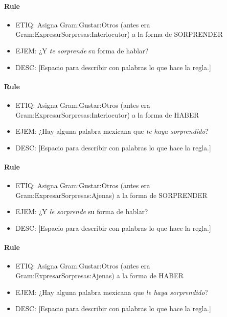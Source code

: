 \documentclass[11pt]{report}
\begin{document}
\paragraph*{Rule}
\begin{itemize}
\item ETIQ: Asigna Gram:Gustar:Otros (antes era Gram:ExpresarSorpresas:Interlocutor) a la forma de SORPRENDER
\item EJEM: ¿Y \emph{te sorprende} su forma de hablar?
\item DESC: [Espacio para describir con palabras lo que hace la regla.]
\end{itemize}

\paragraph*{Rule}
\begin{itemize}
\item ETIQ: Asigna Gram:Gustar:Otros (antes era Gram:ExpresarSorpresas:Interlocutor) a la forma de HABER
\item EJEM: ¿Hay alguna palabra mexicana que \emph{te haya sorprendido}?
\item DESC: [Espacio para describir con palabras lo que hace la regla.]
\end{itemize}

\paragraph*{Rule}
\begin{itemize}
\item ETIQ: Asigna Gram:Gustar:Otros (antes era Gram:ExpresarSorpresas:Ajenas) a la forma de SORPRENDER
\item EJEM: ¿Y \emph{le sorprende} su forma de hablar?
\item DESC: [Espacio para describir con palabras lo que hace la regla.]
\end{itemize}

\paragraph*{Rule}
\begin{itemize}
\item ETIQ: Asigna Gram:Gustar:Otros (antes era Gram:ExpresarSorpresas:Ajenas) a la forma de HABER
\item EJEM: ¿Hay alguna palabra mexicana que \emph{le haya sorprendido}?
\item DESC: [Espacio para describir con palabras lo que hace la regla.]
\end{itemize}
\end{document}

